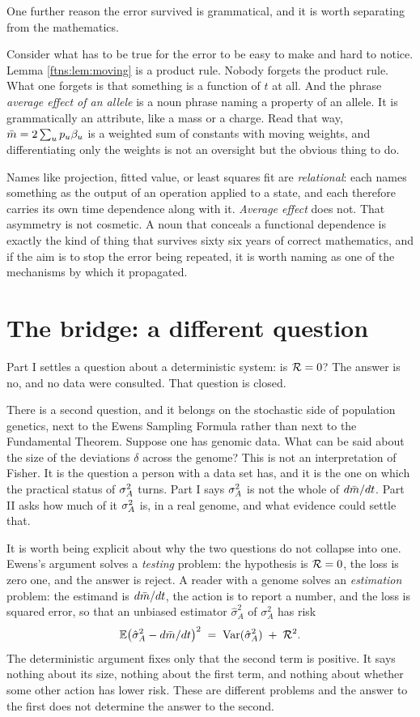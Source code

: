 One further reason the error survived is grammatical, and it is worth separating from the
mathematics.

Consider what has to be true for the error to be easy to make and hard to notice.
Lemma \ref{ftns:lem:moving} is a product rule. Nobody forgets the product rule. What one forgets is that
something is a function of $t$ at all. And the phrase \emph{average effect of an allele} is a noun
phrase naming a property of an allele. It is grammatically an attribute, like a mass or a charge.
Read that way, $\bar{m}=2\sum_up_u\beta_u$ is a weighted sum of constants with moving weights, and
differentiating only the weights is not an oversight but the obvious thing to do.

Names like projection, fitted value, or least squares fit are \emph{relational}: each names
something as the output of an operation applied to a state, and each therefore carries its own time
dependence along with it. \emph{Average effect} does not. That asymmetry is not cosmetic. A noun
that conceals a functional dependence is exactly the kind of thing that survives sixty six years of
correct mathematics, and if the aim is to stop the error being repeated, it is worth naming as one
of the mechanisms by which it propagated.


\section{The bridge: a different question}
\label{ftns:sec:bridge}

Part I settles a question about a deterministic system: is $\mathcal{R}=0$? The answer is no, and no data
were consulted. That question is closed.

There is a second question, and it belongs on the stochastic side of population genetics, next to
the Ewens Sampling Formula rather than next to the Fundamental Theorem. Suppose one has genomic
data. What can be said about the size of the deviations $\delta$ across the genome? This is not an
interpretation of Fisher. It is the question a person with a data set has, and it is the one on
which the practical status of $\sigma^{2}_{A}$ turns. Part I says $\sigma^{2}_{A}$ is not the whole of $d\bar{m}/dt$. Part
II asks how much of it $\sigma^{2}_{A}$ is, in a real genome, and what evidence could settle that.

It is worth being explicit about why the two questions do not collapse into one. Ewens's argument
solves a \emph{testing} problem: the hypothesis is $\mathcal{R}=0$, the loss is zero one, and the answer is
reject. A reader with a genome solves an \emph{estimation} problem: the estimand is $d\bar{m}/dt$,
the action is to report a number, and the loss is squared error, so that an unbiased estimator $\hat\sigma^2_A$ of $\sigma^2_A$ has risk
\[
\mathbb{E}\big(\hat\sigma^2_A-d\bar{m}/dt\big)^2 \;=\; \operatorname{Var}(\hat\sigma^2_A)\;+\;\mathcal{R}^2 .
\]
The deterministic argument fixes only that the second term is positive. It says nothing about its
size, nothing about the first term, and nothing about whether some other action has lower risk.
These are different problems and the answer to the first does not determine the answer to the
second.

